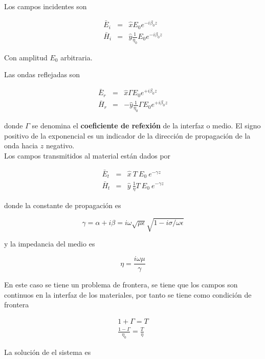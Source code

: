 Los campos incidentes son

\begin{eqnarray*}
\bar{E}_i &=& \hat{x} E_0 e^{- i \beta_0 z} \\
\bar{H}_i &=& \hat{y} \frac{1}{\eta_0} E_0 e^{- i \beta_0 z}
\end{eqnarray*}

Con amplitud $E_0$ arbitraria.

Las ondas reflejadas son 

\begin{eqnarray*}
\bar{E}_r &=& \hat{x} \Gamma E_0 e^{+ i \beta_0 z} \\
\bar{H}_r &=& - \hat{y} \frac{1}{\eta_0} \Gamma E_0 e^{+ i \beta_0 z}
\end{eqnarray*}

donde $\Gamma$ se denomina el \textbf{coeficiente de refexión} de la interfaz o medio. El signo positivo de la exponencial es un indicador de la dirección de propagación de la onda hacia $z$ negativo. \\

Los campos transmitidos al material están dados por

\begin{eqnarray*}
\bar{E}_t &=& \hat{x} \ T \ E_0 \ e^{- \gamma z} \\
\bar{H}_t &=& \hat{y} \ \frac{1}{\eta} T \ E_0 \ e^{-\gamma z}
\end{eqnarray*}

donde la constante de propagación es 

\begin{equation*}
\gamma = \alpha + i \beta = i \omega \sqrt{\mu \epsilon} \sqrt{1- i \sigma / \omega \epsilon}
\end{equation*}

y la impedancia del medio es

\begin{equation*}
\eta = \frac{i \omega \mu}{\gamma}
\end{equation*}

En este caso se tiene un problema de frontera, se tiene que los campos son continuos en la interfaz de los materiales, por tanto se tiene como condición de frontera

\begin{eqnarray*}
1 + \Gamma = T \\
\frac{1 - \Gamma}{\eta_0} = \frac{T}{\eta}
\end{eqnarray*}

La solución de el sistema es

